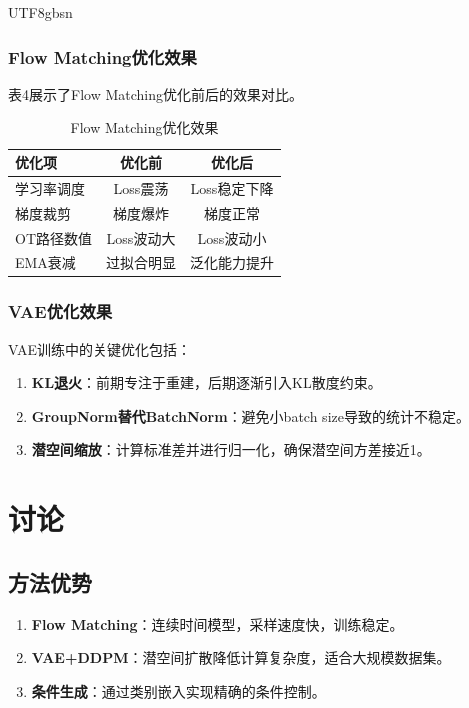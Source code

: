 \documentclass[11pt,a4paper]{article}
\begin{document}
\begin{CJK*}{UTF8}{gbsn}
\subsubsection{Flow Matching优化效果}

表4展示了Flow Matching优化前后的效果对比。

\begin{table}[h]
\centering
\caption{Flow Matching优化效果}
\begin{tabular}{lcc}
\toprule
优化项 & 优化前 & 优化后 \\
\midrule
学习率调度 & Loss震荡 & Loss稳定下降 \\
梯度裁剪 & 梯度爆炸 & 梯度正常 \\
OT路径数值 & Loss波动大 & Loss波动小 \\
EMA衰减 & 过拟合明显 & 泛化能力提升 \\
\bottomrule
\end{tabular}
\end{table}

\subsubsection{VAE优化效果}

VAE训练中的关键优化包括：
\begin{enumerate}
\item \textbf{KL退火}：前期专注于重建，后期逐渐引入KL散度约束。
\item \textbf{GroupNorm替代BatchNorm}：避免小batch size导致的统计不稳定。
\item \textbf{潜空间缩放}：计算标准差并进行归一化，确保潜空间方差接近1。
\end{enumerate}

\section{讨论}

\subsection{方法优势}

\begin{enumerate}
\item \textbf{Flow Matching}：连续时间模型，采样速度快，训练稳定。
\item \textbf{VAE+DDPM}：潜空间扩散降低计算复杂度，适合大规模数据集。
\item \textbf{条件生成}：通过类别嵌入实现精确的条件控制。
\end{enumerate}


\end{CJK*}
\end{document}
